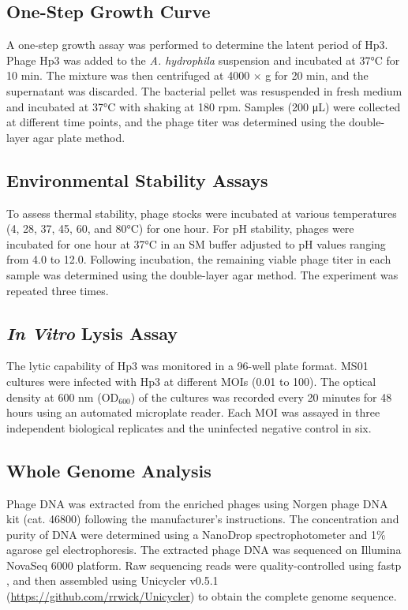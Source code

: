 \documentclass[11pt,a4paper]{article}
\begin{document}
\subsection{One-Step Growth Curve}\label{one-step-growth-curve}

A one-step growth assay was performed to determine the latent period
of Hp3. Phage Hp3 was added to the \emph{A. hydrophila} suspension and
incubated at 37°C for 10 min. The mixture was then centrifuged at 4000 ×
g for 20 min, and the supernatant was discarded. The bacterial pellet
was resuspended in fresh medium and incubated at 37°C with shaking at
180 rpm. Samples (200 μL) were collected at different time points, and
the phage titer was determined using the double-layer agar plate method.

\subsection{Environmental Stability
Assays}\label{environmental-stability-assays}

To assess thermal stability, phage stocks were incubated at various
temperatures (4, 28, 37, 45, 60, and 80°C) for one hour. For pH
stability, phages were incubated for one hour at 37°C in an SM buffer
adjusted to pH values ranging from 4.0 to 12.0. Following incubation,
the remaining viable phage titer in each sample was determined using the
double-layer agar method. The experiment was repeated three times.

\subsection{\texorpdfstring{\emph{In Vitro} Lysis
Assay}{\emph{In Vitro} Lysis Assay}}\label{in-vitro-lysis-assay}

The lytic capability of Hp3 was monitored in a 96-well plate format.
MS01 cultures were infected with Hp3 at different MOIs (0.01 to 100).
The optical density at 600 nm (\(\mathrm{OD}_{600}\)) of the cultures
was recorded every 20 minutes for 48 hours using an automated microplate
reader. Each MOI was assayed in three independent biological replicates and the
uninfected negative control in six.

\subsection{Whole Genome Analysis}\label{whole-genome-analysis}

Phage DNA was extracted from the enriched phages using Norgen phage DNA
kit (cat. 46800) following the manufacturer's instructions. The concentration
and purity of DNA were determined using a NanoDrop spectrophotometer and
1\% agarose gel electrophoresis. The extracted phage DNA was sequenced
on Illumina NovaSeq 6000 platform. Raw sequencing reads were
quality-controlled using fastp \citep{2018-Fastp_Chen}, and then
assembled using Unicycler v0.5.1
(\url{https://github.com/rrwick/Unicycler}) to obtain the complete
genome sequence.
\end{document}
